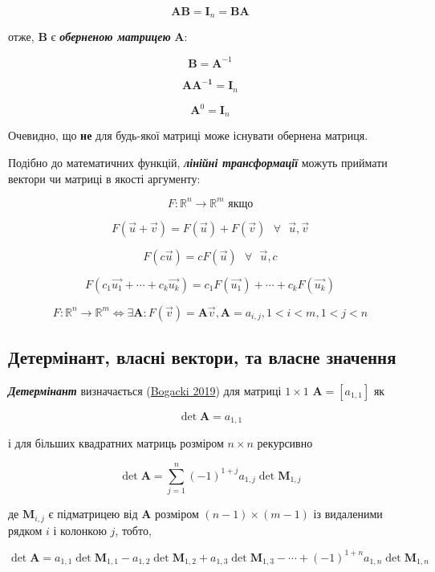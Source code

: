 \documentclass[
  11pt,
]{book}
\begin{document}
\[\mathbf{AB} = \mathbf{I}_n = \mathbf{BA}\]

отже, \(\mathbf{B}\) є \textbf{\emph{оберненою матрицею}} \(\mathbf{A}\):

\[\mathbf{B} = \mathbf{A}^{-1}\]

\[\mathbf{AA^{-1}} = \mathbf{I}_n\]

\[\mathbf{A}^0 = \mathbf{I}_n\]

Очевидно, що \textbf{не} для будь-якої матриці може існувати обернена матриця.

Подібно до математичних функцій, \textbf{\emph{лінійні трансформації}} можуть приймати вектори чи матриці в якості аргументу:

\[F: \mathbb{R}^n \rightarrow \mathbb{R}^m \text{ якщо}\]

\[F(\vec{u} + \vec{v}) = F(\vec{u}) + F(\vec{v}) \text{ } \forall \text{ } \vec{u}, \vec{v}\]

\[F(c \vec{u}) = c F(\vec{u}) \text{ } \forall \text{ } \vec{u}, c\]

\[F(c_1 \vec{u_1} + \cdots + c_k \vec{u_k}) = c_1 F(\vec{u_1}) + \cdots + c_k F(\vec{u_k})\]

\[F: \mathbb{R}^n \rightarrow \mathbb{R}^m \iff \exists \mathbf{A}: F(\vec{v}) = \mathbf{A} \vec{v}, \mathbf{A} = a_{i, j}, 1 < i<m, 1 < j < n\]

\subsection{Детермінант, власні вектори, та власне значення}\label{ux434ux435ux442ux435ux440ux43cux456ux43dux430ux43dux442-ux432ux43bux430ux441ux43dux456-ux432ux435ux43aux442ux43eux440ux438-ux442ux430-ux432ux43bux430ux441ux43dux435-ux437ux43dux430ux447ux435ux43dux43dux44f}

\textbf{\emph{Детермінант}} визначається (\href{https://books.google.com/books/about/Linear_Algebra.html?id=P8BZzAEACAAJ}{Bogacki 2019}) для матриці \(1 \times 1\) \(\mathbf{A} = [a_{1, 1}]\) як

\[\det \mathbf{A} = a_{1, 1}\]

і для більших квадратних матриць розміром \(n \times n\) рекурсивно

\[\det \mathbf{A} = \sum \limits_{j=1}^n (-1)^{1+j} a_{1, j} \det \mathbf{M}_{1,j}\]

де \(\mathbf{M}_{i,j}\) є підматрицею від \(\mathbf{A}\) розміром \((n - 1) \times (m - 1)\) із видаленими рядком \(i\) і колонкою \(j\), тобто,

\[\det \mathbf{A} = a_{1,1} \det \mathbf{M}_{1,1} - a_{1,2} \det \mathbf{M}_{1,2} + a_{1,3} \det \mathbf{M}_{1,3} - \cdots + (-1)^{1+n} a_{1, n} \det \mathbf{M}_{1,n}\]
\end{document}
